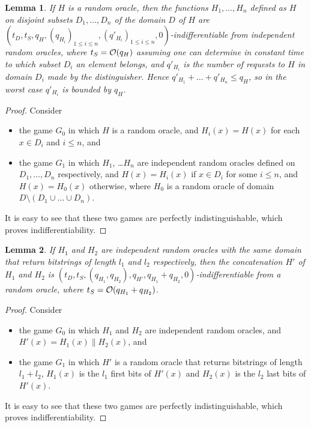 \documentclass[compsoc, conference, letterpaper, 10pt, times]{IEEEtran}
\newtheorem{lemma}{Lemma}
\newcommand{\ab}{\allowbreak}
\begin{document}
\begin{lemma}\label{lem:disjdomain}
If $H$ is a random oracle, then the functions $H_1, \dots, H_n$ defined 
as $H$ on disjoint subsets $D_1, \dots, D_n$ of the domain $D$ of $H$ are $(t_D, \ab t_S, \ab q_H, \ab (q_{H_i})_{1 \leq i \leq n}, \ab (q'_{H_i})_{1 \leq i \leq n}, 0)$-indifferentiable
from independent random oracles, where $t_S = {\cal O}(q_H)$ assuming one can determine in constant time to which subset $D_i$ an element belongs, and $q'_{H_i}$ is the number of requests to $H$ in domain $D_i$ made by the distinguisher. Hence $q'_{H_1} + \dots + q'_{H_n} \leq q_H$, so in the worst case $q'_{H_i}$ is bounded by $q_H$. 
\end{lemma}
\begin{proof}
Consider
\begin{itemize}[leftmargin=*]
\item  the game $G_0$ in which $H$ is a random oracle, and $H_i(x) = H(x)$
for each $x \in D_i$ and $i \leq n$, and 
\item the game $G_1$ in which $H_1$, \dots $H_n$ 
are independent random oracles defined on $D_1, \dots, D_n$ respectively, and
$H(x) = H_i(x)$ if $x \in D_i$ for some $i \leq n$, and $H(x) = H_0(x)$ otherwise,
where $H_0$ is a random oracle of domain $D \setminus (D_1 \cup \dots \cup D_n)$.
\end{itemize}
It is easy to see that these two games are perfectly indistinguishable,
which proves indifferentiability.
\end{proof}

\begin{lemma}\label{lem:concatenation}
If $H_1$ and $H_2$ are independent random oracles with the same domain that return bitstrings of length $l_1$ and $l_2$ respectively, then 
the concatenation $H'$ of $H_1$ and $H_2$ is $(t_D, t_S, (q_{H_1}, q_{H_2}), q_{H'}, q_{H_1} + q_{H_2}, 0)$-indifferentiable from a random oracle, where $t_S = {\cal O}(q_{H_1} + q_{H_2})$.
\end{lemma}
\begin{proof}
Consider
\begin{itemize}[leftmargin=*]
\item  the game $G_0$ in which $H_1$ and $H_2$ are independent random oracles,
  and $H'(x) = H_1(x) \| H_2(x)$, and
\item the game $G_1$ in which $H'$ is a random oracle that returns bitstrings
  of length $l_1 + l_2$, $H_1(x)$ is the $l_1$ first bits of $H'(x)$
  and $H_2(x)$ is the $l_2$ last bits of $H'(x)$.
\end{itemize}
It is easy to see that these two games are perfectly indistinguishable,
which proves indifferentiability.
\end{proof}
\end{document}

